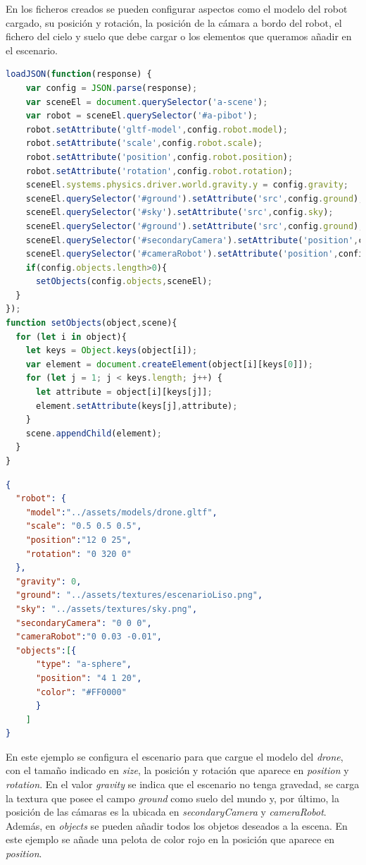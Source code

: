 En los ficheros creados se pueden configurar aspectos como el modelo del robot cargado, su posición y rotación, la posición de la cámara a bordo del robot, el fichero del cielo y suelo que debe cargar o los elementos que queramos añadir en el escenario. 
\begin{lstlisting}[language=JavaScript,caption=script que carga los ficheros de configuración,label={list:conf}]
  loadJSON(function(response) {
    var config = JSON.parse(response);
    var sceneEl = document.querySelector('a-scene');
    var robot = sceneEl.querySelector('#a-pibot');
    robot.setAttribute('gltf-model',config.robot.model);
    robot.setAttribute('scale',config.robot.scale);
    robot.setAttribute('position',config.robot.position);
    robot.setAttribute('rotation',config.robot.rotation);
    sceneEl.systems.physics.driver.world.gravity.y = config.gravity;
    sceneEl.querySelector('#ground').setAttribute('src',config.ground);
    sceneEl.querySelector('#sky').setAttribute('src',config.sky);
    sceneEl.querySelector('#ground').setAttribute('src',config.ground);
    sceneEl.querySelector('#secondaryCamera').setAttribute('position',config.secondaryCamera);
    sceneEl.querySelector('#cameraRobot').setAttribute('position',config.cameraRobot);
    if(config.objects.length>0){
      setObjects(config.objects,sceneEl);
  }
});
function setObjects(object,scene){
  for (let i in object){
    let keys = Object.keys(object[i]);
    var element = document.createElement(object[i][keys[0]]);
    for (let j = 1; j < keys.length; j++) {
      let attribute = object[i][keys[j]];
      element.setAttribute(keys[j],attribute);
    }
    scene.appendChild(element);
  }
}
\end{lstlisting}
\begin{lstlisting}[language=json]
  {
  "robot": {
    "model":"../assets/models/drone.gltf",
    "scale": "0.5 0.5 0.5",
    "position":"12 0 25",
    "rotation": "0 320 0"
  },
  "gravity": 0,
  "ground": "../assets/textures/escenarioLiso.png",
  "sky": "../assets/textures/sky.png",
  "secondaryCamera": "0 0 0",
  "cameraRobot":"0 0.03 -0.01",
  "objects":[{
      "type": "a-sphere",
      "position": "4 1 20",
      "color": "#FF0000"
      }
    ]
}
\end{lstlisting}

En este ejemplo se configura el escenario para que cargue el modelo del \textit{drone}, con el tamaño indicado en \textit{size}, la posición y rotación que aparece en \textit{position} y \textit{rotation}. En el valor \textit{gravity} se indica que el escenario no tenga gravedad, se carga la textura que posee el campo \textit{ground} como suelo del mundo y, por último, la posición de las cámaras es la ubicada en \textit{secondaryCamera} y \textit{cameraRobot}. Además, en \textit{objects} se pueden añadir todos los objetos deseados a la escena. En este ejemplo se añade una pelota de color rojo en la posición que aparece en \textit{position}.


